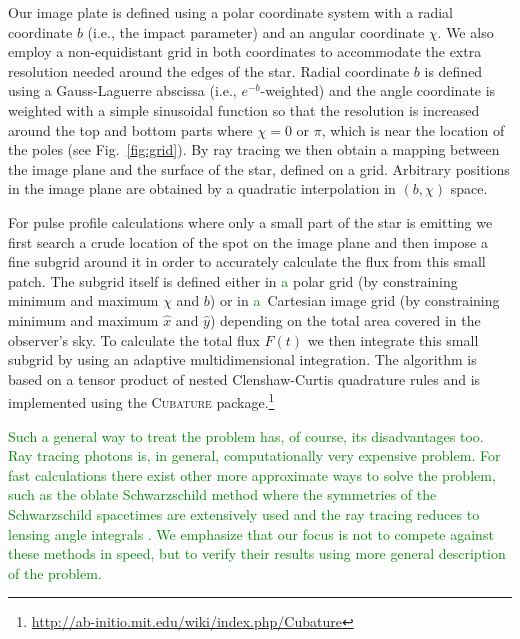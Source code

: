 \documentclass{aa}
\newcommand{\refe}[1]{\textcolor{green}{{#1}}}
\newcommand{\sch}{Schwarzschild }
\begin{document}
Our image plate is defined using a polar coordinate system with a radial
coordinate $b$ (i.e., the impact parameter) and an angular coordinate $\chi$.
We also employ a non-equidistant grid in both coordinates to accommodate
the extra resolution needed around the edges of the star.  Radial
coordinate $b$ is defined using a Gauss-Laguerre abscissa (i.e.,
$e^{-b}$-weighted) and the angle coordinate is weighted with a simple
sinusoidal function so that the resolution is increased around the top
and bottom parts where $\chi = 0$ or $\pi$, which is near the location of the poles
(see Fig.~\ref{fig:grid}).  By ray tracing we then obtain
a mapping between the image plane and the surface of the star, defined
on a grid.
Arbitrary positions in the image plane are obtained by a quadratic interpolation in $(b, \chi)$ space.

For pulse profile calculations where only a small part of the star is
emitting we first search a crude location of the spot on the image plane
and then impose a fine subgrid around it in order to accurately
calculate the flux from this small patch.  The subgrid itself is defined
either in \refe{a} polar grid (by constraining minimum and maximum $\chi$ and
$b$) or in \refe{a} Cartesian image grid (by constraining minimum and maximum
$\hat{x}$ and $\hat{y}$) depending on the total area covered in the observer's sky.  To
calculate the total flux $F(t)$ we then integrate this small subgrid by
using an adaptive multidimensional integration.  
The algorithm is based on a tensor product of nested Clenshaw-Curtis quadrature rules and is implemented using the \textsc{Cubature} package.\footnote{
\url{http://ab-initio.mit.edu/wiki/index.php/Cubature}}

\refe{
Such a general way to treat the problem has, of course, its disadvantages too.
Ray tracing photons is, in general, computationally very expensive problem.
For fast calculations there exist other more approximate ways to solve the problem, such as the oblate \sch method where the symmetries of the \sch spacetimes are extensively used and the ray tracing reduces to lensing angle integrals \citep[see e.g.][]{PB06, MLC07}.
We emphasize that our focus is not to compete against these methods in speed, but to verify their results using more general description of the problem.
}
\end{document}
